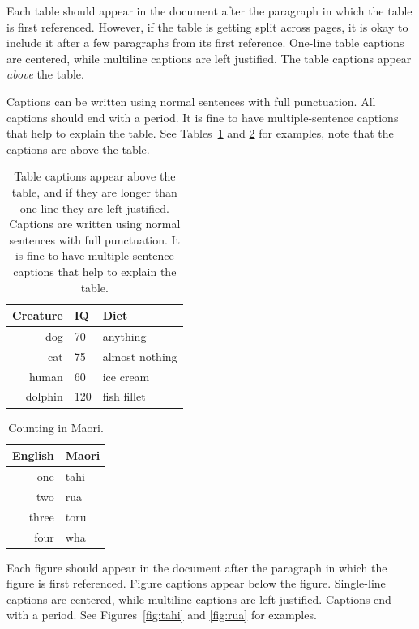 \documentclass{scspaperproc}
\theoremstyle{scsthe}
\begin{document}
Each table should appear in the document after the paragraph in which the table is first referenced. However, if the table is getting split across pages, it is okay to include it after a few paragraphs from its first reference. One-line table captions are centered, while multiline captions are left justified. The table captions appear \emph{above} the table. 

Captions can be written using normal sentences with full punctuation. All captions should end with a period. It is fine to have multiple-sentence captions that help to explain the table. See Tables~\ref{tab:first} and \ref{tab:second} for examples, note that the captions are above the table.


\begin{table}[htb]
\caption{Table captions appear above the table, and if they are longer than one line they are left justified. Captions are written using normal sentences with full punctuation. It is fine to have multiple-sentence captions that help to explain the table.}\label{tab:first}
\centering
\begin{tabular}{rll}
\hline
Creature & IQ & Diet\\ \hline
dog & 70 & anything\\
cat & 75 & almost nothing\\
human & 60 & ice cream \\
dolphin & 120 & fish fillet\\
\hline
\end{tabular}
\end{table}

\begin{table}[htb]
\centering
\caption{Counting in Maori.}\label{tab:second}
\begin{tabular}{r|l}
English & Maori \\ \hline
one & tahi \\
two & rua \\
three & toru \\
four & wha \\
\end{tabular}
\end{table}

Each figure should appear in the document after the paragraph in which the figure is first referenced. Figure captions appear below the figure. Single-line captions are centered, while multiline captions are left justified. Captions end with a period. See Figures~\ref{fig:tahi} and \ref{fig:rua} for examples.
\end{document}
